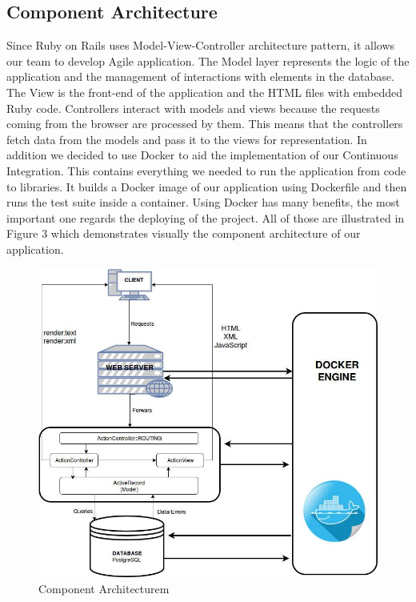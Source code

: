 \documentclass{l3proj}
\begin{document}
\subsection{Component Architecture}
\label{sec:component}

Since Ruby on Rails uses Model-View-Controller architecture pattern, it allows our team to develop Agile application. The Model layer represents the logic of the application and the management of interactions with elements in the database. The View is the front-end of the application and the HTML files with embedded Ruby code. Controllers interact with models and views because the requests coming from the browser are processed by them. This means that the controllers fetch data from the models and pass it to the views for representation. 
In addition we decided to use Docker to aid the implementation of our Continuous Integration. This contains everything we needed to run the application from code to libraries. It builds a Docker image of our application using Dockerfile and then runs the test suite inside a container. Using Docker has many benefits, the most important one regards the deploying of the project.
All of those are illustrated in Figure 3 which demonstrates visually the component architecture of our application.

\begin{figure}
  \centerline{\includegraphics[width=\textwidth, height=\textheight, keepaspectratio]{component.png}}
  \caption{Component Architecturem}
  \label{fig:ca}
\end{figure}
\end{document}
